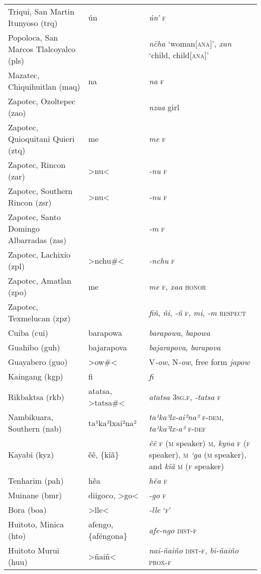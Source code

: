 \begin{longtable}{L{.25\textwidth}L{.25\textwidth}L{.5\textwidth}}
Triqui, San Martin Itunyoso (trq)	&	ún\textquotesingle{}	&	\textit{ún’} \textsc{f}	\\
Popoloca, San Marcos Tlalcoyalco (pls)	&		&	\textit{nc̈ha} ‘woman[\textsc{ana}]’, \textit{xan} ‘child, child[\textsc{ana}]’	\\
Mazatec, Chiquihuitlan (maq)	&	na	&	\textit{na} \textsc{f}	\\
Zapotec, Ozoltepec (zao)	&		&	\textit{nzaa} girl	\\
Zapotec, Quioquitani Quieri (ztq)	&	me	&	\textit{me} \textsc{f}	\\
Zapotec, Rincon (zar)	&	>nu<	&	\textit{-nu} \textsc{f}	\\
Zapotec, Southern Rincon (zsr) 	&	>nu<	&	\textit{-nu} \textsc{f}	\\
Zapotec, Santo Domingo Albarradas (zas)	&		&	\textit{-m} \textsc{f}	\\
Zapotec, Lachixio (zpl)	&	>nchu\#<	&	\textit{-nchu} \textsc{f}	\\
Zapotec, Amatlan (zpo)	&	me	&	\textit{me} \textsc{f}, \textit{xaa} \textsc{honor}	\\
Zapotec, Texmelucan (zpz)	&		&	\textit{fiñ}, \textit{ñi}, \textit{-ñ} \textsc{f}, \textit{mi}, \textit{-m} \textsc{respect}	\\
Cuiba (cui)	&	barapowa	&	\textit{barapowa}, \textit{bapowa}	\\
Guahibo (guh)	&	bajarapova	&	\textit{bajarapova}, \textit{barapova}	\\
Guayabero (guo)	&	>ow\#<	&	V\textit{-ow}, N\textit{-ow}, free form \textit{japow}	\\
Kaingang (kgp)	&	fi	&	\textit{fi}	\\
Rikbaktsa (rkb)	&	atatsa, >tatsa\#<	&	\textit{atatsa} \textsc{3sg.f}, \textit{-tatsa} \textsc{f}	\\
Nambikuara, Southern (nab)	&	ta¹ka³lxai²na²	&	\textit{ta¹ka³lx-ai²na²} \textsc{f-dem}, \textit{ta¹ka³lx-a²} \textsc{f-def}	\\
Kayabi (kyz)	&	ẽẽ, \{kĩã\}	&	\textit{ẽẽ} \textsc{f} (\textsc{m} speaker) \textsc{m}, \textit{kyna} \textsc{f} (\textsc{f} speaker), \textsc{m} \textit{‘ga} (\textsc{m} speaker), and \textit{kĩã} \textsc{m} (\textsc{f} speaker)	\\
Tenharim (pah)	&	hẽa	&	\textit{hẽa} \textsc{f}	\\
Muinane (bmr)	&	diigoco, >go<	&	\textit{-go} \textsc{f}	\\
Bora (boa)	&	>lle<	&	\textit{-lle} ‘\textsc{f}’	\\
Huitoto, Minica (hto)	&	afengo, \{aféngona\}	&	\textit{afe-ngo} \textsc{dist-f}	\\
Huitoto Murui (huu)	&	>ñaiñ<	&	\textit{nai-ñaiño} \textsc{dist-f}, \textit{bi-ñaiño} \textsc{prox-f}	\\
\end{longtable}



